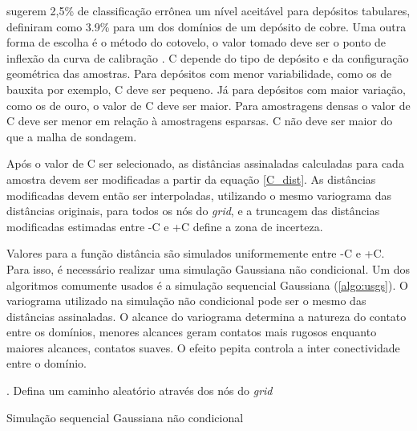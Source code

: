  sugerem 2,5\% de classificação errônea um nível aceitável para depósitos tabulares, \cite{martin2017implicitmodeling} definiram como 3.9\% para um dos domínios de um depósito de cobre. Uma outra forma de escolha é o método do cotovelo, o valor tomado deve ser o ponto de inflexão da curva de calibração \cite{martin2017implicitmodeling}. C depende do tipo de depósito e da configuração geométrica das amostras. Para depósitos com menor variabilidade, como os de bauxita por exemplo, C deve ser pequeno. Já para depósitos com maior variação, como os de ouro, o valor de C deve ser maior. Para amostragens densas o valor de C deve ser menor em relação à amostragens esparsas. C não deve ser maior do que a malha de sondagem.

Após o valor de C ser selecionado, as distâncias assinaladas calculadas para cada amostra devem ser modificadas a partir da equação \autoref{C_dist}. As distâncias modificadas devem então ser interpoladas, utilizando o mesmo variograma das distâncias originais, para todos os nós do \textit{grid}, e a truncagem das distâncias modificadas estimadas entre -C e +C define a zona de incerteza.

Valores para a função distância são simulados uniformemente entre -C e +C. Para isso, é necessário realizar uma simulação Gaussiana não condicional. Um dos algoritmos comumente usados é a simulação sequencial Gaussiana (\autoref{algo:usgs}). O variograma utilizado na simulação não condicional pode ser o mesmo das distâncias assinaladas. O alcance do variograma determina a natureza do contato entre os domínios, menores alcances geram contatos mais rugosos enquanto maiores alcances, contatos suaves. O efeito pepita controla a inter conectividade entre o domínio.

\begin{algorithm}
. Defina um caminho aleatório através dos nós do \textit{grid}\;
 \caption{Simulação sequencial Gaussiana não condicional}\label{algo:usgs}
\end{algorithm}

